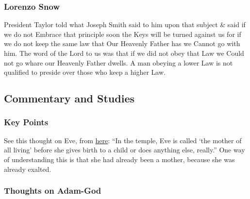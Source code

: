 		
	\subsubsection{Lorenzo Snow} %
		\label{ADAMGOD-LS}
		
		\begin{compactdesc}
			\item[14 October 1882, WWJ 8:126] President Taylor told what Joseph Smith said to him upon that subject \& said if we do not Embrace that principle soon the Keys will be turned against us for if we do not keep the same law that Our Heavenly Father has we Cannot go with him. The word of the Lord to us was that if we did not obey that Law we Could not go whare our Heavenly Father dwells. A man obeying a lower Law is not qualified to preside over those who keep a higher Law.
		\end{compactdesc}
	
\subsection{Commentary and Studies} %
	\label{ADAMGOD-COMMENTARY}

	\subsubsection{Key Points}
		\label{ADAMGOD-KEYS}
	
		\begin{compactitem}
			\item See this thought on Eve, from \hyperref[EVE-KEYS]{here}: ``In the temple, Eve is called `the mother of all living' before she gives birth to a child or does anything else, really.'' One way of understanding this is that she had already been a mother, because she was already exalted.
		\end{compactitem}
		
	\subsubsection{Thoughts on Adam-God}
		\label{ADAMGOD-thoughts}
		
